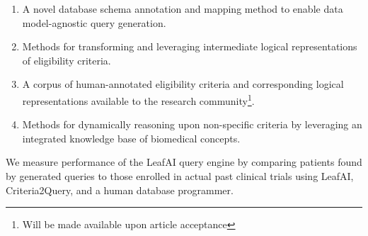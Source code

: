 \documentclass[../main.tex]{subfiles}
\begin{document}
\begin{enumerate}
    \item{A novel database schema annotation and mapping method to enable data model-agnostic query generation.}
    \item{Methods for transforming and leveraging intermediate logical representations of eligibility criteria.}
    \item{A corpus of human-annotated eligibility criteria and corresponding logical representations available to the research community\footnote{Will be made available upon article acceptance}.}
    \item{Methods for dynamically reasoning upon non-specific criteria by leveraging an integrated knowledge base of biomedical concepts.}
\end{enumerate}

\noindent We measure performance of the LeafAI query engine by comparing patients found by generated queries to those enrolled in actual past clinical trials using LeafAI, Criteria2Query, and a human database programmer.
\end{document}
